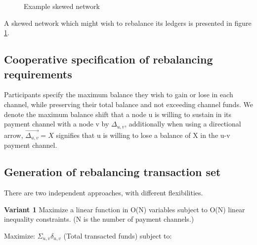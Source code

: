 \documentclass[12pt]{article}
\begin{document}
\begin{figure}[H]
\centering
{}
\caption{Example skewed network}
\label{skewed}
\end{figure}

A skewed network which might wish to rebalance its ledgers is presented in figure \ref{skewed}.

\subsection{Cooperative specification of rebalancing requirements}
Participants specify the maximum balance they wish to gain or lose in each channel, while preserving their total balance and not exceeding channel funds. We denote the maximum balance shift that a node u is willing to sustain in its payment channel with a node v by $\Delta_{u,v}$, additionally when using a directional arrow, $\overrightarrow{\Delta_{u,v}} = X$ signifies that u is willing to lose a balance of X in the u-v payment channel.

\subsection{Generation of rebalancing transaction set}
There are two independent approaches, with different flexibilities.

\textbf{Variant 1} Maximize a linear function in O(N) variables subject to O(N) linear inequality constraints. (N is the number of payment channels.)

Maximize: $\Sigma_{u,v} \delta_{u,v}$ (Total transacted funds) subject to:
\end{document}

